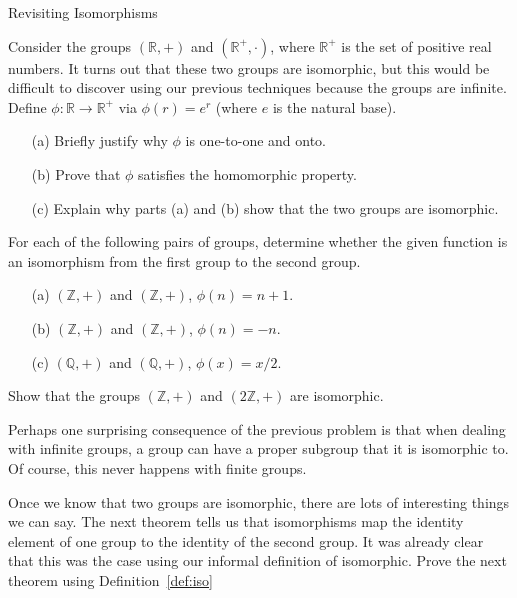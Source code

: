 \begin{section}{Revisiting Isomorphisms}
\begin{problem}
Consider the groups $(\mathbb{R},+)$ and $(\mathbb{R}^+,\cdot)$, where $\mathbb{R}^+$ is the set of positive real numbers.  It turns out that these two groups are isomorphic, but this would be difficult to discover using our previous techniques because the groups are infinite.  Define $\phi:\mathbb{R}\to \mathbb{R}^+$ via $\phi(r)=e^r$ (where $e$ is the natural base).
\begin{enumerate}
\item[(a)] Briefly justify why $\phi$ is one-to-one and onto.
\item[(b)] Prove that $\phi$ satisfies the homomorphic property.
\item[(c)] Explain why parts (a) and (b) show that the two groups are isomorphic.
\end{enumerate}
\end{problem}

\begin{exercise}
For each of the following pairs of groups, determine whether the given function is an isomorphism from the first group to the second group.
\begin{enumerate}
\item[(a)] $(\mathbb{Z},+)$ and $(\mathbb{Z},+)$, $\phi(n)=n+1$.
\item[(b)] $(\mathbb{Z},+)$ and $(\mathbb{Z},+)$, $\phi(n)=-n$.
\item[(c)] $(\mathbb{Q},+)$ and $(\mathbb{Q},+)$, $\phi(x)=x/2$.
\end{enumerate}

\end{exercise}

\begin{problem}
Show that the groups $(\mathbb{Z},+)$ and $(2\mathbb{Z},+)$ are isomorphic.
\end{problem}

Perhaps one surprising consequence of the previous problem is that when dealing with infinite groups, a group can have a proper subgroup that it is isomorphic to.  Of course, this never happens with finite groups.

Once we know that two groups are isomorphic, there are lots of interesting things we can say.  The next theorem tells us that isomorphisms map the identity element of one group to the identity of the second group.  It was already clear that this was the case using our informal definition of isomorphic.  Prove the next theorem using Definition~\ref{def:iso}


\end{section}
